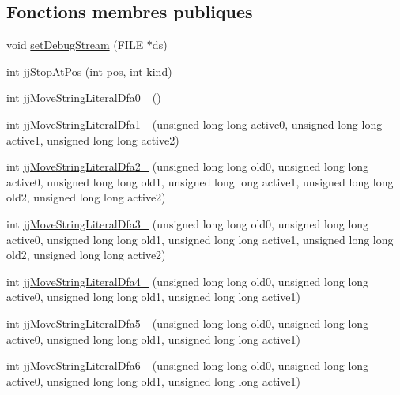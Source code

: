 \subsection*{Fonctions membres publiques}
\begin{DoxyCompactItemize}
\item 
void \hyperlink{classvhdl_1_1parser_1_1_vhdl_parser_token_manager_a5e2cb39e044c789dafdff268ceb6957c}{set\+Debug\+Stream} (F\+I\+L\+E $\ast$ds)
\item 
int \hyperlink{classvhdl_1_1parser_1_1_vhdl_parser_token_manager_ad355ab4302c01a5cc400d280642b693b}{jj\+Stop\+At\+Pos} (int pos, int kind)
\item 
int \hyperlink{classvhdl_1_1parser_1_1_vhdl_parser_token_manager_a2799317f4ebaa48cd6abaeddc2bb13b8}{jj\+Move\+String\+Literal\+Dfa0\+\_} ()
\item 
int \hyperlink{classvhdl_1_1parser_1_1_vhdl_parser_token_manager_a9770d39c8b674e338c697509e4133800}{jj\+Move\+String\+Literal\+Dfa1\+\_} (unsigned long long active0, unsigned long long active1, unsigned long long active2)
\item 
int \hyperlink{classvhdl_1_1parser_1_1_vhdl_parser_token_manager_a7b4829266370d7434407890aece710f7}{jj\+Move\+String\+Literal\+Dfa2\+\_} (unsigned long long old0, unsigned long long active0, unsigned long long old1, unsigned long long active1, unsigned long long old2, unsigned long long active2)
\item 
int \hyperlink{classvhdl_1_1parser_1_1_vhdl_parser_token_manager_a57f85ceff69584e5294c367739b24813}{jj\+Move\+String\+Literal\+Dfa3\+\_} (unsigned long long old0, unsigned long long active0, unsigned long long old1, unsigned long long active1, unsigned long long old2, unsigned long long active2)
\item 
int \hyperlink{classvhdl_1_1parser_1_1_vhdl_parser_token_manager_a3cfe7491719c522f77988019b7ee20c5}{jj\+Move\+String\+Literal\+Dfa4\+\_} (unsigned long long old0, unsigned long long active0, unsigned long long old1, unsigned long long active1)
\item 
int \hyperlink{classvhdl_1_1parser_1_1_vhdl_parser_token_manager_aa1c9eb7b393a84921220d0136d748dbd}{jj\+Move\+String\+Literal\+Dfa5\+\_} (unsigned long long old0, unsigned long long active0, unsigned long long old1, unsigned long long active1)
\item 
int \hyperlink{classvhdl_1_1parser_1_1_vhdl_parser_token_manager_ab641f1690033a6fc956f0d00f735d293}{jj\+Move\+String\+Literal\+Dfa6\+\_} (unsigned long long old0, unsigned long long active0, unsigned long long old1, unsigned long long active1)

\end{DoxyCompactItemize}
